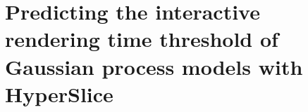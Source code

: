 
\chapter{Predicting the interactive rendering time threshold of Gaussian process models with HyperSlice}










